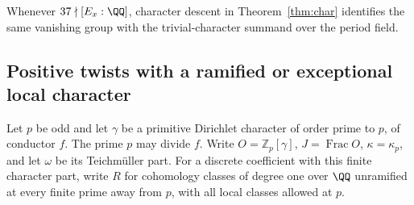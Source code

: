 \documentclass[a4paper,11pt]{article}
\theoremstyle{definition}
\theoremstyle{remark}
\newcommand{\ZZ}{\mathbb Z}\newcommand{\ord}{\operatorname{ord}}
\numberwithin{equation}{section}
\begin{document}
Whenever \(37\nmid[E_x:\QQ]\), character descent in
Theorem~\ref{thm:char} identifies the same vanishing group with
the trivial-character summand over the period field.

\subsection{Positive twists with a ramified or exceptional local character}\label{nav:III-72}
Let \(p\) be odd and let \(\gamma\) be a primitive Dirichlet
character of order prime to \(p\), of conductor \(f\). The prime
\(p\) may divide \(f\). Write \(O=\ZZ_p[\gamma]\),
\(J=\operatorname{Frac}O\), \(\kappa=\kappa_p\), and let \(\omega\)
be its Teichm\"uller part. For a discrete coefficient with this
finite character part, write \(R\) for cohomology classes of degree
one over \(\QQ\) unramified at every finite prime away from \(p\),
with all local classes allowed at \(p\).
\end{document}
